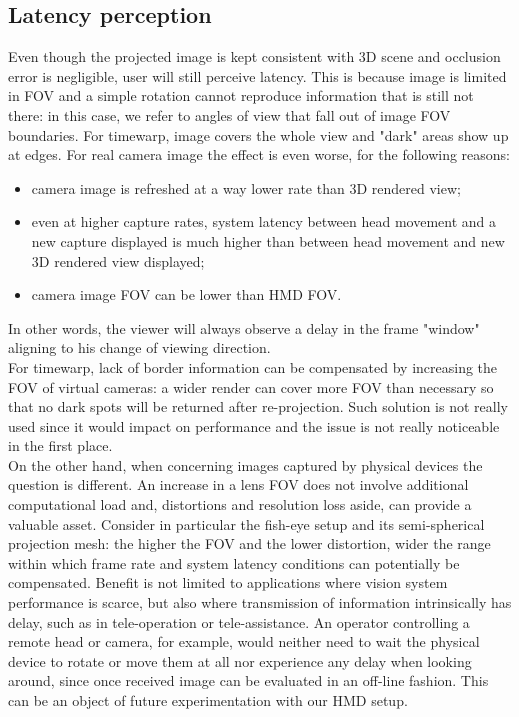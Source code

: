\subsection{Latency perception}
Even though the projected image is kept consistent with 3D scene and occlusion error is negligible, user will still perceive latency. This is because image is limited in FOV and a simple rotation cannot reproduce information that is still not there: in this case, we refer to angles of view that fall out of image FOV boundaries. For timewarp, image covers the whole view and "dark" areas show up at edges. For real camera image the effect is even worse, for the following reasons:
\begin{itemize}
\item camera image is refreshed at a way lower rate than 3D rendered view;
\item even at higher capture rates, system latency between head movement and a new capture displayed is much higher than between head movement and new 3D rendered view displayed;
\item camera image FOV can be lower than HMD FOV.
\end{itemize}
In other words, the viewer will always observe a delay in the frame "window" aligning to his change of viewing direction.\\
For timewarp, lack of border information can be compensated by increasing the FOV of virtual cameras: a wider render can cover more FOV than necessary so that no dark spots will be returned after re-projection. Such solution is not really used since it would impact on performance and the issue is not really noticeable in the first place.\\
On the other hand, when concerning images captured by physical devices the question is different. An increase in a lens FOV does not involve additional computational load and, distortions and resolution loss aside, can provide a valuable asset. Consider in particular the fish-eye setup and its semi-spherical projection mesh: the higher the FOV and the lower distortion, wider the range within which frame rate and system latency conditions can potentially be compensated. Benefit is not limited to applications where vision system performance is scarce, but also where transmission of information intrinsically has delay, such as in tele-operation or tele-assistance. An operator controlling a remote head or camera, for example, would neither need to wait the physical device to rotate or move them at all nor experience any delay when looking around, since once received image can be evaluated in an off-line fashion. This can be an object of future experimentation with our HMD setup.\\
